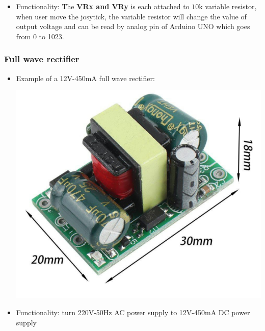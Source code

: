 \documentclass[12pt]{article}
\begin{document}
\begin{itemize}
                \item Functionality: The \textbf{VRx and VRy} is each attached to $10$k variable resistor, when user move the josytick, the variable resistor will change the value of output voltage and can be read by analog pin of Arduino UNO which goes from 0 to 1023.
            \end{itemize}

        \subsubsection{Full wave rectifier}
            \begin{itemize}
                \item Example of a 12V-450mA full wave rectifier:
                \begin{center}
                    \includegraphics[scale = 0.5]{./images/ac-dc.png}
                \end{center}

                \item Functionality: turn 220V-50Hz AC power supply to 12V-450mA DC power supply
            \end{itemize}
\end{document}

